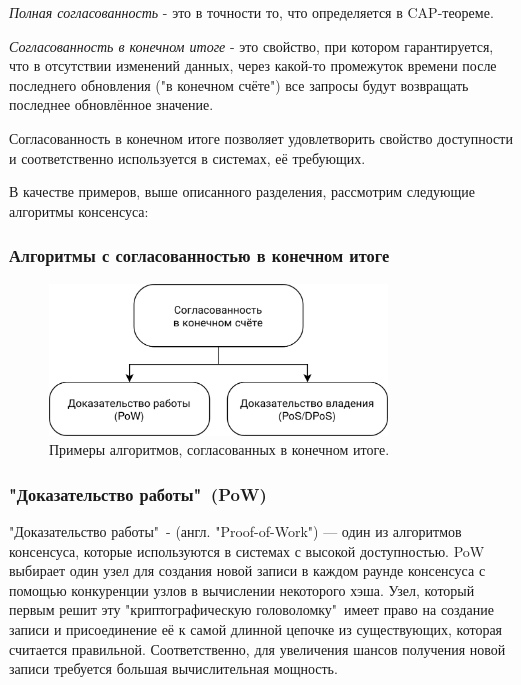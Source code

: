 \documentclass[subf, href, colorlinks=true, 14pt,
times, mtpro, specialist]{disser}
\theoremstyle{definition}
\begin{document}
\emph{Полная согласованность} - это в точности то, что определяется в CAP-теореме.

\emph{Согласованность в конечном итоге} - это свойство, при котором гарантируется, что в отсутствии изменений данных, через какой-то промежуток времени после последнего обновления ("в конечном счёте") все запросы будут возвращать последнее обновлённое значение.

Согласованность в конечном итоге позволяет удовлетворить свойство доступности и соответственно используется в системах, её требующих.

В качестве примеров, выше описанного разделения, рассмотрим следующие алгоритмы консенсуса:

\subsubsection{Алгоритмы с согласованностью в конечном итоге}

\begin{figure}[H]
\centering
\includegraphics[width=0.8\textwidth]{src/pics/consensus_types_2.png}
\caption{Примеры алгоритмов, согласованных в конечном итоге.}
\label{fig:consensus_types_2}
\end{figure}


\subsubsection{"Доказательство работы"\ (PoW)}

"Доказательство работы"\ - (англ. "Proof-of-Work"{}) --- один из алгоритмов консенсуса, которые используются в системах с высокой доступностью. PoW выбирает один узел для создания новой записи в каждом раунде консенсуса с помощью конкуренции узлов в вычислении некоторого хэша. Узел, который первым решит эту "криптографическую головоломку"\, имеет право на создание записи и присоединение её к самой длинной цепочке из существующих, которая считается правильной. Соответственно, для увеличения шансов получения новой записи требуется большая вычислительная мощность. 
\end{document}
